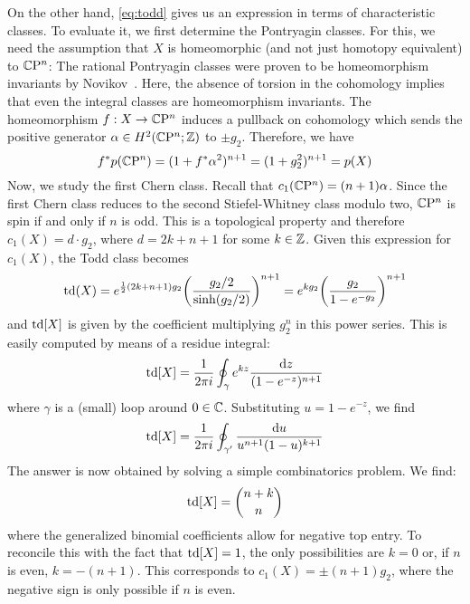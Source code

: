\begin{myproof}
	On the other hand, \eqref{eq:todd} gives us an expression in terms of characteristic classes. To evaluate it, we first determine the Pontryagin classes. For this, we need the assumption that $X$ is homeomorphic (and not just homotopy equivalent) to $\mathbb{C}\mathrm{P}^n$: The rational Pontryagin classes were proven to be homeomorphism invariants by Novikov~\cite{Nov1966}. Here, the absence of torsion in the cohomology implies that even the integral classes are homeomorphism invariants. The homeomorphism $f:X\to \mathbb{C}\mathrm{P}^n$ induces a pullback on cohomology which sends the positive generator $\alpha\in H^2(\mathbb{C}\mathrm{P}^n;\mathbb{Z})$ to $\pm g_2$. Therefore, we have
	\begin{equation*}
		f^*p(\mathbb{C}\mathrm{P}^n)=(1+f^*\alpha^2)^{n+1}=(1+g_2^2)^{n+1}=p(X)
	\end{equation*}
	Now, we study the first Chern class. Recall that $c_1(\mathbb{C}\mathrm{P}^n)=(n+1)\alpha$. Since the first Chern class reduces to the second Stiefel-Whitney class modulo two, $\mathbb{C}\mathrm{P}^n$ is spin if and only if $n$ is odd. This is a topological property and therefore $c_1(X)=d\cdot g_2$, where $d=2k+n+1$ for some $k\in \mathbb{Z}$. Given this expression for $c_1(X)$, the Todd class becomes
	\begin{equation*}
		\operatorname{td}(X)=e^{\frac{1}{2}(2k+n+1)g_2}\bigg(\frac{g_2/2}{\sinh (g_2/2)}\bigg)^{n+1}
		=e^{kg_2}\bigg(\frac{g_2}{1-e^{-g_2}}\bigg)^{n+1}
	\end{equation*}
	and $\operatorname{td}[X]$ is given by the coefficient multiplying $g_2^n$ in this power series. This is easily computed by means of a residue integral:
	\begin{equation*}
		\operatorname{td}[X]=\frac{1}{2\pi i}\oint_\gamma e^{kz}\frac{\mathrm{d} z}{(1-e^{-z})^{n+1}}
	\end{equation*}
	where $\gamma$ is a (small) loop around $0\in\mathbb{C}$. Substituting $u=1-e^{-z}$, we find 
	\begin{equation*}
		\operatorname{td}[X]=\frac{1}{2\pi i}\oint_{\gamma'} \frac{\mathrm{d} u}{u^{n+1}(1-u)^{k+1}}
	\end{equation*}
	The answer is now obtained by solving a simple combinatorics problem. We find:
	\begin{equation*}
		\operatorname{td}[X]= \binom{n+k}{n}
	\end{equation*}
	where the generalized binomial coefficients allow for negative top entry. To reconcile this with the fact that $\operatorname{td}[X]=1$, the only possibilities are $k=0$ or, if $n$ is even, $k=-(n+1)$. This corresponds to $c_1(X)=\pm (n+1)g_2$, where the negative sign is only possible if $n$ is even. 
	

\end{myproof}
